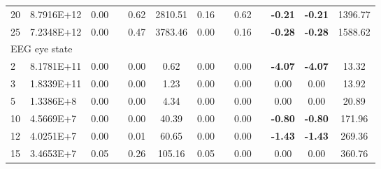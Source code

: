 {\begin{longtable}{@{}llccccccccccc@{}}
\multicolumn{1}{l|}{20} & \multicolumn{1}{l|}{8.7916E+12} & 0.00 & \multicolumn{1}{c|}{}    & 0.62 & \multicolumn{1}{c|}{2810.51}  & 0.16 & \multicolumn{1}{c|}{}    & 0.62 & \multicolumn{1}{c|}{}    & \textbf{-0.21}  & \textbf{-0.21}  & 1396.77 \\
\multicolumn{1}{l|}{25} & \multicolumn{1}{l|}{7.2348E+12} & 0.00 & \multicolumn{1}{c|}{}    & 0.47 & \multicolumn{1}{c|}{3783.46}  & 0.00 & \multicolumn{1}{c|}{}    & 0.16 & \multicolumn{1}{c|}{}    & \textbf{-0.28}  & \textbf{-0.28}  & 1588.62 \\ \hline
\multicolumn{13}{l}{EEG eye state}                                                                                                                                                                                                                   \\ \hline
\multicolumn{1}{l|}{2}  & \multicolumn{1}{l|}{8.1781E+11} & 0.00 & \multicolumn{1}{c|}{}    & 0.00 & \multicolumn{1}{c|}{0.62}     & 0.00 & \multicolumn{1}{c|}{}    & 0.00 & \multicolumn{1}{c|}{}    & \textbf{-4.07}  & \textbf{-4.07}  & 13.32   \\
\multicolumn{1}{l|}{3}  & \multicolumn{1}{l|}{1.8339E+11} & 0.00 & \multicolumn{1}{c|}{}    & 0.00 & \multicolumn{1}{c|}{1.23}     & 0.00 & \multicolumn{1}{c|}{}    & 0.00 & \multicolumn{1}{c|}{}    & 0.00            & 0.00            & 13.92   \\
\multicolumn{1}{l|}{5}  & \multicolumn{1}{l|}{1.3386E+8}  & 0.00 & \multicolumn{1}{c|}{}    & 0.00 & \multicolumn{1}{c|}{4.34}     & 0.00 & \multicolumn{1}{c|}{}    & 0.00 & \multicolumn{1}{c|}{}    & 0.00            & 0.00            & 20.89   \\
\multicolumn{1}{l|}{10} & \multicolumn{1}{l|}{4.5669E+7}  & 0.00 & \multicolumn{1}{c|}{}    & 0.00 & \multicolumn{1}{c|}{40.39}    & 0.00 & \multicolumn{1}{c|}{}    & 0.00 & \multicolumn{1}{c|}{}    & \textbf{-0.80}  & \textbf{-0.80}  & 171.96  \\
\multicolumn{1}{l|}{12} & \multicolumn{1}{l|}{4.0251E+7}  & 0.00 & \multicolumn{1}{c|}{}    & 0.01 & \multicolumn{1}{c|}{60.65}    & 0.00 & \multicolumn{1}{c|}{}    & 0.00 & \multicolumn{1}{c|}{}    & \textbf{-1.43}  & \textbf{-1.43}  & 269.36  \\
\multicolumn{1}{l|}{15} & \multicolumn{1}{l|}{3.4653E+7}  & 0.05 & \multicolumn{1}{c|}{}    & 0.26 & \multicolumn{1}{c|}{105.16}   & 0.05 & \multicolumn{1}{c|}{}    & 0.00 & \multicolumn{1}{c|}{}    & 0.00            & 0.00            & 360.76  \\

\end{longtable}}
